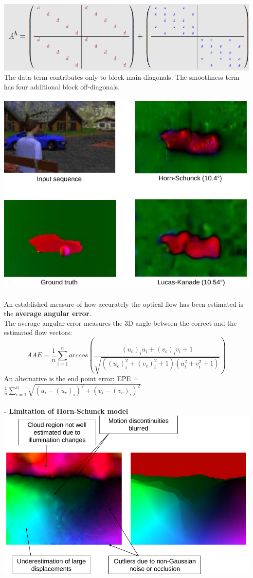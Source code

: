 \documentclass{article}
\begin{document}
\includegraphics[scale=0.3]{60.png}\\
The data term contributes only to block main diagonals. The smoothness term has four additional block off-diagonals.\\\\
\includegraphics[scale=0.3]{61.png}\\\\
An established measure of how accurately the optical flow has been estimated is the \textbf{average angular error}. \\
The average angular error measures the 3D angle between the correct and the estimated flow vectors:
\begin{equation}
AAE = \frac{1}{n} \sum_{i=1}^n arccos(\frac{(u_c)_i u_i+(v_c)_i v_i+1}{\sqrt{((u_c)_i^2+(v_c)_i^2+1)(u_i^2+v_i^2+1)}})
\end{equation}
An alternative is the end point error: EPE = $\frac{1}{n}\sum_{i=1}^n\sqrt{(u_i-(u_c)_i)^2+(v_i-(v_c)_i)^2}$\\\\
\textbf{- Limitation of Horn-Schunck model}\\
\includegraphics[scale=0.3]{62.png}
\newpage
\section{}
\end{document}
